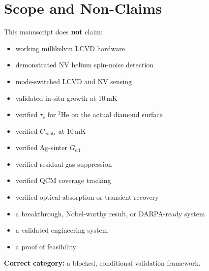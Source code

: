 \documentclass[12pt,a4paper]{article}
\newcommand{\blocked}{\textsc{blocked}}
\newcommand{\conditional}{\textsc{conditional}}
\newcommand{\derivedcheck}{\textsc{derived\_check}}
\newcommand{\unknown}{\textsc{unknown}}
\begin{document}
\begin{abstract}
Gate counts: 0~\textsc{Pass} $|$ 47~\conditional{} $|$ 0~\textsc{Fail}
$|$ 2~\unknown{} $|$ 23~\blocked{} $|$ 11~\derivedcheck{} (D9 gas kinetics; 10 non-lumped multiphysics numerical checks).
\medskip

\noindent\textbf{Canonical source of truth.} These counts are computed by
\texttt{qta\_full\_sim.py} and recorded in \texttt{results\_gate\_table.csv}: 83
gates in total --- 0 PASS, 47 CONDITIONAL, 23 BLOCKED, 2 UNKNOWN, 11 DERIVED\_CHECK.
The canonical $\tau_c$ threshold is 292\,$\mu$s (v3.3); the earlier 27.728\,$\mu$s
value (v3.0) is SUPERSEDED, NOT\_CANONICAL, NOT\_LIVE\_GATE\_LOGIC.

\end{abstract}

\section{Scope and Non-Claims}
\label{sec:nonclaims}

This manuscript does \textbf{not} claim:
\begin{itemize}[noitemsep]
  \item working millikelvin LCVD hardware
  \item demonstrated NV helium spin-noise detection
  \item mode-switched LCVD and NV sensing
  \item validated in-situ growth at 10\,mK
  \item verified $\tau_c$ for $^3$He on the actual diamond surface
  \item verified $C_\mathrm{contr}$ at 10\,mK
  \item verified Ag-sinter $G_\mathrm{eff}$
  \item verified residual gas suppression
  \item verified QCM coverage tracking
  \item verified optical absorption or transient recovery
  \item a breakthrough, Nobel-worthy result, or DARPA-ready system
  \item a validated engineering system
  \item a proof of feasibility
\end{itemize}

\textbf{Correct category:} a blocked, conditional validation framework.
\end{document}
